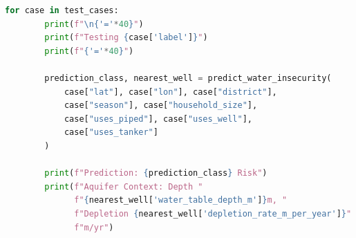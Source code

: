 \documentclass[conference]{IEEEtran}
\begin{document}
\begin{lstlisting}[language=Python, caption=Water Insecurity Prediction Function]
    for case in test_cases:
        print(f"\n{'='*40}")
        print(f"Testing {case['label']}")
        print(f"{'='*40}")
        
        prediction_class, nearest_well = predict_water_insecurity(
            case["lat"], case["lon"], case["district"], 
            case["season"], case["household_size"], 
            case["uses_piped"], case["uses_well"], 
            case["uses_tanker"]
        )
        
        print(f"Prediction: {prediction_class} Risk")
        print(f"Aquifer Context: Depth "
              f"{nearest_well['water_table_depth_m']}m, "
              f"Depletion {nearest_well['depletion_rate_m_per_year']}"
              f"m/yr")
\end{lstlisting}
\end{document}
